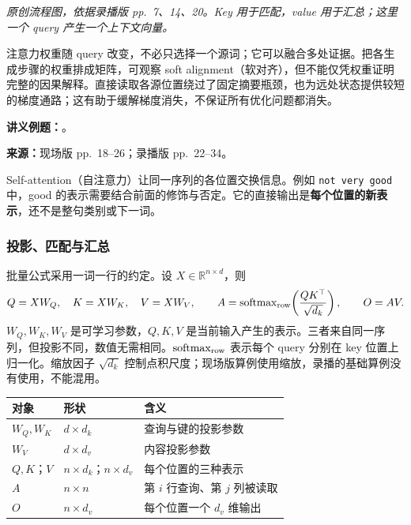 \begin{center}

\end{center}
{\small\textit{原创流程图，依据录播版 pp.~7、14、20。Key 用于匹配，value 用于汇总；这里一个 query 产生一个上下文向量。}}

注意力权重随 query 改变，不必只选择一个源词；它可以融合多处证据。把各生成步骤的权重排成矩阵，可观察 soft alignment（软对齐），但不能仅凭权重证明完整的因果解释。直接读取各源位置绕过了固定摘要瓶颈，也为远处状态提供较短的梯度通路；这有助于缓解梯度消失，不保证所有优化问题都消失。

\textbf{讲义例题：}。

\nopagebreak[4]
\textbf{来源：}现场版 pp.~18--26；录播版 pp.~22--34。

Self-attention（自注意力）让同一序列的各位置交换信息。例如 \texttt{not very good} 中，good 的表示需要结合前面的修饰与否定。它的直接输出是\textbf{每个位置的新表示}，还不是整句类别或下一词。

\subsubsection{投影、匹配与汇总}

批量公式采用一词一行的约定。设 $X\in\mathbb R^{n\times d}$，则
\[
 Q=XW_Q,\quad K=XW_K,\quad V=XW_V,
 \qquad
 A=\operatorname{softmax}_{\rm row}\!\left(\frac{QK^\top}{\sqrt{d_k}}\right),
 \qquad O=AV.
\]
$W_Q,W_K,W_V$ 是可学习参数，$Q,K,V$ 是当前输入产生的表示。三者来自同一序列，但投影不同，数值无需相同。$\operatorname{softmax}_{\rm row}$ 表示每个 query 分别在 key 位置上归一化。缩放因子 $\sqrt{d_k}$ 控制点积尺度；现场版算例使用缩放，录播的基础算例没有使用，不能混用。

\begin{center}
\small
\begin{tabular}{@{}lll@{}}
\toprule
对象 & 形状 & 含义 \\
\midrule
$W_Q,W_K$ & $d\times d_k$ & 查询与键的投影参数 \\
$W_V$ & $d\times d_v$ & 内容投影参数 \\
$Q,K$；$V$ & $n\times d_k$；$n\times d_v$ & 每个位置的三种表示 \\
$A$ & $n\times n$ & 第 $i$ 行查询、第 $j$ 列被读取 \\
$O$ & $n\times d_v$ & 每个位置一个 $d_v$ 维输出 \\
\bottomrule
\end{tabular}
\end{center}

